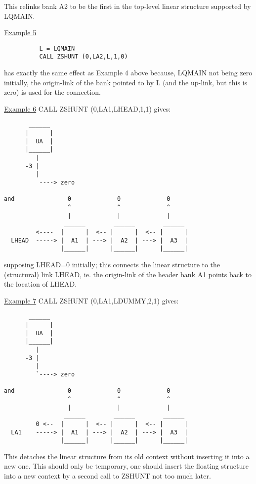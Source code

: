 This relinks bank A2 to be the first in the top-level linear
structure supported by LQMAIN.

\vspace{4mm}
\ul{Example 5}
\begin{verbatim}
          L = LQMAIN
          CALL ZSHUNT (0,LA2,L,1,0)
\end{verbatim} 
has exactly the same effect as Example 4 above because,
LQMAIN not being zero initially,
the origin-link of the bank pointed to by L
(and the up-link, but this is zero)
is used for the connection.


\ul{Example 6} \hspace{12mm} CALL ZSHUNT (0,LA1,LHEAD,1,1)  \hspace{5mm} gives:
\begin{verbatim}
       ______
      |      |
      |  UA  |
      |______|
         |
      -3 |
         |
          ----> zero

and               0             0             0
                  ^             ^             ^
                  |             |             |
                 ______        ______        ______
         <----  |      |  <-- |      |  <-- |      |
  LHEAD  -----> |  A1  | ---> |  A2  | ---> |  A3  |
                |______|      |______|      |______|
\end{verbatim} 

supposing LHEAD=0 initially; this connects the linear structure
to the (structural) link LHEAD, ie. the origin-link of the header bank A1
points back to the location of LHEAD.

\vspace{4mm}
\ul{Example 7} \hspace{12mm} CALL ZSHUNT (0,LA1,LDUMMY,2,1) \hspace{5mm} gives:
\begin{verbatim}
       ______
      |      |
      |  UA  |
      |______|
         |
      -3 |
         |
         `----> zero

and               0             0             0
                  ^             ^             ^
                  |             |             |
                 ______        ______        ______
         0 <--  |      |  <-- |      |  <-- |      |
  LA1    -----> |  A1  | ---> |  A2  | ---> |  A3  |
                |______|      |______|      |______|
\end{verbatim} 
This detaches the linear structure from its old context
without inserting it into a new one.
This should only be temporary, one should insert the floating
structure into a new context by a second call to ZSHUNT
not too much later.

